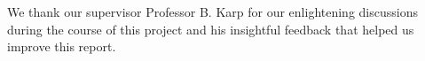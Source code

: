 \documentclass[../main.tex]{subfiles}
\begin{document}
We thank our supervisor Professor B. Karp for our enlightening discussions
during the course of this project and his insightful feedback that helped us
improve this report.
\end{document}
